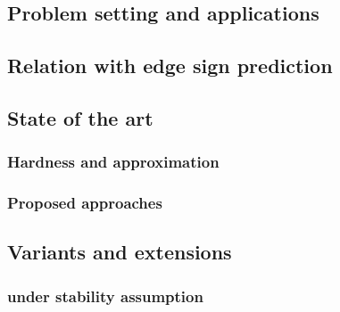 
\subsection{Problem setting and applications}
\label{sub:problem_setting}


\subsection{Relation with edge sign prediction}
\label{sub:relation_with_edge_sign_prediction}


\subsection{State of the art}
\label{sub:state_of_the_art}

\subsubsection{Hardness and approximation}

\subsubsection{Proposed approaches}


\subsection{Variants and extensions}
\label{sub:variants_and_extensions}


\subsubsection{\pcc{} under stability assumption}
\label{ssub:cc_under_stability_assumption}


\iffalse
\subsubsection{Parallel \pcc{}}
\label{ssub:parallel_cc}

\subsection{Empirical evaluation?}
\label{sub:cc_empiracal_evaluation}
\fi
